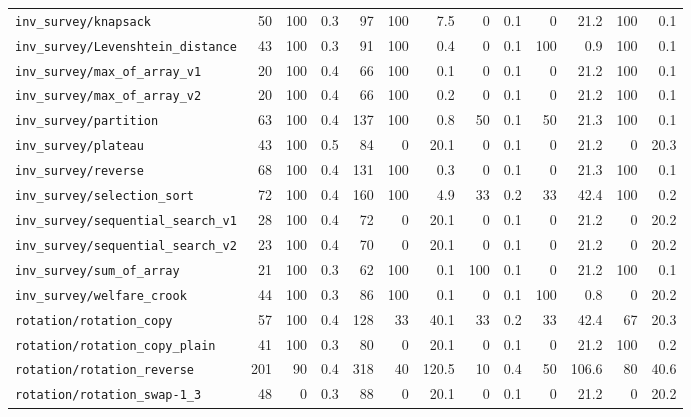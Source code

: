 \documentclass[a4paper,final]{llncs}
\begin{document}
\begin{table}
\begin{tabular}{l |r *{1}{rr} |r *{4}{rr}}
\verb|inv_survey/knapsack|  &  50  &  100  &  0.3  &  97  &  100  &  7.5  &  0  &  0.1  &  0  &  21.2  &  100  &  0.1  \\
\verb|inv_survey/Levenshtein_distance|  &  43  &  100  &  0.3  &  91  &  100  &  0.4  &  0  &  0.1  &  100  &  0.9  &  100  &  0.1  \\
\verb|inv_survey/max_of_array_v1|  &  20  &  100  &  0.4  &  66  &  100  &  0.1  &  0  &  0.1  &  0  &  21.2  &  100  &  0.1  \\
\verb|inv_survey/max_of_array_v2|  &  20  &  100  &  0.4  &  66  &  100  &  0.2  &  0  &  0.1  &  0  &  21.2  &  100  &  0.1  \\
\verb|inv_survey/partition|  &  63  &  100  &  0.4  &  137  &  100  &  0.8  &  50  &  0.1  &  50  &  21.3  &  100  &  0.1  \\
\verb|inv_survey/plateau|  &  43  &  100  &  0.5  &  84  &  0  &  20.1  &  0  &  0.1  &  0  &  21.2  &  0  &  20.3  \\
\verb|inv_survey/reverse|  &  68  &  100  &  0.4  &  131  &  100  &  0.3  &  0  &  0.1  &  0  &  21.3  &  100  &  0.1  \\
\verb|inv_survey/selection_sort|  &  72  &  100  &  0.4  &  160  &  100  &  4.9  &  33  &  0.2  &  33  &  42.4  &  100  &  0.2  \\
\verb|inv_survey/sequential_search_v1|  &  28  &  100  &  0.4  &  72  &  0  &  20.1  &  0  &  0.1  &  0  &  21.2  &  0  &  20.2  \\
\verb|inv_survey/sequential_search_v2|  &  23  &  100  &  0.4  &  70  &  0  &  20.1  &  0  &  0.1  &  0  &  21.2  &  0  &  20.2  \\
\verb|inv_survey/sum_of_array|  &  21  &  100  &  0.3  &  62  &  100  &  0.1  &  100  &  0.1  &  0  &  21.2  &  100  &  0.1  \\
\verb|inv_survey/welfare_crook|  &  44  &  100  &  0.3  &  86  &  100  &  0.1  &  0  &  0.1  &  100  &  0.8  &  0  &  20.2  \\
\verb|rotation/rotation_copy|  &  57  &  100  &  0.4  &  128  &  33  &  40.1  &  33  &  0.2  &  33  &  42.4  &  67  &  20.3  \\
\verb|rotation/rotation_copy_plain|  &  41  &  100  &  0.3  &  80  &  0  &  20.1  &  0  &  0.1  &  0  &  21.2  &  100  &  0.2  \\
\verb|rotation/rotation_reverse|  &  201  &  90  &  0.4  &  318  &  40  &  120.5  &  10  &  0.4  &  50  &  106.6  &  80  &  40.6  \\
\verb|rotation/rotation_swap-1_3|  &  48  &  0  &  0.3  &  88  &  0  &  20.1  &  0  &  0.1  &  0  &  21.2  &  0  &  20.2  \\

\end{tabular}
\end{table}
\end{document}
